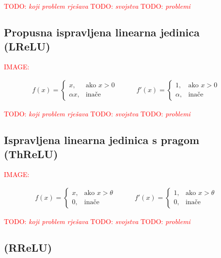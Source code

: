 \documentclass[times, utf8, diplomski]{fer}
\def\TODO#1{\noindent\textcolor{red}{TODO: \textit{#1}}\newline}
\def\todo#1{\TODO{#1}}
\def\todoimg#1{\begin{center} \textcolor{red}{IMAGE: \textit{#1}} \end{center}}
\begin{document}
\todo{koji problem rješava}
\todo{svojstva}
\todo{problemi}

\subsection*{Propusna ispravljena linearna jedinica (LReLU)}

\todoimg{}

\begin{equation}
\begin{split}
f(x) = 
\begin{cases}
x,			& \text{ako } x > 0 \\
\alpha x,	& \text{inače}
\end{cases}
\end{split}
\qquad
\begin{split}
f'(x) = 
\begin{cases}
1,		& \text{ako } x > 0 \\
\alpha,	& \text{inače}
\end{cases}
\end{split}
\end{equation}

\todo{koji problem rješava}
\todo{svojstva}
\todo{problemi}

\subsection*{Ispravljena linearna jedinica s pragom (ThReLU)}

\todoimg{}

\begin{equation}
\begin{split}
f(x) = 
\begin{cases}
x,		& \text{ako } x > \theta \\
0,		& \text{inače}
\end{cases}
\end{split}
\qquad
\begin{split}
f'(x) = 
\begin{cases}
1,		& \text{ako } x > \theta \\
0,		& \text{inače}
\end{cases}
\end{split}
\end{equation}

\todo{koji problem rješava}
\todo{svojstva}
\todo{problemi}

\subsection*{(RReLU)}
\end{document}
